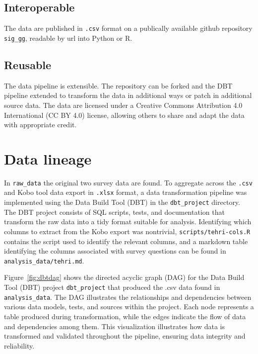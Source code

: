 \documentclass{article}
\begin{document}
\subsection{Interoperable}

The data are published in \texttt{.csv} format on a publically available github repository \texttt{sig\_gg}, readable by url into Python or R.  

\subsection{Reusable}

The data pipeline is extensible. The repository can be forked and the DBT pipeline extended to transform the data in additional ways or patch in additional source data. The data are licensed under a Creative Commons Attribution 4.0 International (CC BY 4.0) license, allowing others to share and adapt the data with appropriate credit.

\section{Data lineage}

In \texttt{raw\_data} the original two survey data are found. To aggregate across the \texttt{.csv} and Kobo tool data export in \texttt{.xlsx} format, a data transformation pipeline was implemented using the Data Build Tool (DBT) in the \texttt{dbt\_project} directory. The DBT project consists of SQL scripts, tests, and documentation that transform the raw data into a tidy format suitable for analysis. Identifying which columns to extract from the Kobo export was nontrivial, \texttt{scripts/tehri-cols.R} contains the script used to identify the relevant columns, and a markdown table identifying the columns associated with survey questions can be found in \texttt{analysis\_data/tehri.md}.

Figure~\ref{fig:dbtdag} shows the directed acyclic graph (DAG) for the Data Build Tool (DBT) project \texttt{dbt\_project} that produced the .csv data found in \texttt{analysis\_data}. The DAG illustrates the relationships and dependencies between various data models, tests, and sources within the project. Each node represents a table produced during transformation, while the edges indicate the flow of data and dependencies among them. This visualization illustrates how data is transformed and validated throughout the pipeline, ensuring data integrity and reliability.
\end{document}
